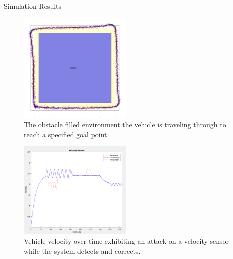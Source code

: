 \begin{section}{Simulation Results}
\begin{figure}
\vspace{1pt}
\centering
\includegraphics[width=0.48\textwidth]{sim_environment.png}
\caption{The obstacle filled environment the vehicle is traveling through to reach a specified goal point.}
\label{fig:sim_env}
\end{figure}

\begin{figure}
\vspace{1pt}
\centering
\includegraphics[width=0.48\textwidth]{vel_t.png}
\caption{Vehicle velocity over time exhibiting an attack on a velocity sensor while the system detects and corrects.}
\label{fig:vel_t}
\end{figure}





\end{section}